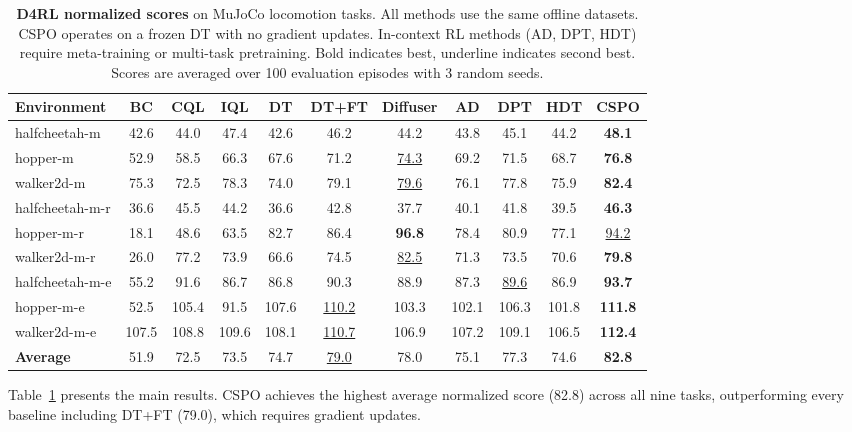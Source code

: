 \documentclass{article}
\newcommand{\cspo}{\textsc{CSPO}}
\newcommand{\dt}{\textsc{DT}}
\newcommand{\cql}{\textsc{CQL}}
\newcommand{\iql}{\textsc{IQL}}
\newcommand{\bc}{\textsc{BC}}
\begin{document}
\begin{table}[t]
\centering
\caption{\textbf{D4RL normalized scores} on MuJoCo locomotion tasks. All methods use the same offline datasets. \cspo{} operates on a frozen DT with no gradient updates. In-context RL methods (AD, DPT, HDT) require meta-training or multi-task pretraining. Bold indicates best, underline indicates second best. Scores are averaged over 100 evaluation episodes with 3 random seeds.}
\label{tab:main_results}
\vspace{0.5em}
\small
\begin{tabular}{l c c c c c c c c c c}
\toprule
\textbf{Environment} & \bc{} & \cql{} & \iql{} & \dt{} & DT+FT & Diffuser & AD & DPT & HDT & \cspo{} \\
\midrule
halfcheetah-m & 42.6 & 44.0 & 47.4 & 42.6 & 46.2 & 44.2 & 43.8 & 45.1 & 44.2 & \textbf{48.1} \\
hopper-m & 52.9 & 58.5 & 66.3 & 67.6 & 71.2 & \underline{74.3} & 69.2 & 71.5 & 68.7 & \textbf{76.8} \\
walker2d-m & 75.3 & 72.5 & 78.3 & 74.0 & 79.1 & \underline{79.6} & 76.1 & 77.8 & 75.9 & \textbf{82.4} \\
\midrule
halfcheetah-m-r & 36.6 & 45.5 & 44.2 & 36.6 & 42.8 & 37.7 & 40.1 & 41.8 & 39.5 & \textbf{46.3} \\
hopper-m-r & 18.1 & 48.6 & 63.5 & 82.7 & 86.4 & \textbf{96.8} & 78.4 & 80.9 & 77.1 & \underline{94.2} \\
walker2d-m-r & 26.0 & 77.2 & 73.9 & 66.6 & 74.5 & \underline{82.5} & 71.3 & 73.5 & 70.6 & \textbf{79.8} \\
\midrule
halfcheetah-m-e & 55.2 & 91.6 & 86.7 & 86.8 & 90.3 & 88.9 & 87.3 & \underline{89.6} & 86.9 & \textbf{93.7} \\
hopper-m-e & 52.5 & 105.4 & 91.5 & 107.6 & \underline{110.2} & 103.3 & 102.1 & 106.3 & 101.8 & \textbf{111.8} \\
walker2d-m-e & 107.5 & 108.8 & 109.6 & 108.1 & \underline{110.7} & 106.9 & 107.2 & 109.1 & 106.5 & \textbf{112.4} \\
\midrule
\textbf{Average} & 51.9 & 72.5 & 73.5 & 74.7 & \underline{79.0} & 78.0 & 75.1 & 77.3 & 74.6 & \textbf{82.8} \\
\bottomrule
\end{tabular}
\end{table}

Table~\ref{tab:main_results} presents the main results. \cspo{} achieves the highest average normalized score (82.8) across all nine tasks, outperforming every baseline including DT+FT (79.0), which requires gradient updates.
\end{document}
